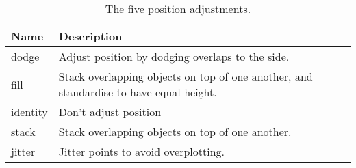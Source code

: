 \begin{table}[ht]
\centering
\begin{tabular}{ll}
  \hline
Name & Description \\ 
  \hline
dodge & Adjust position by dodging overlaps to the side. \\ 
  fill & Stack overlapping objects on top of one another, and standardise to have equal height. \\ 
  identity & Don't adjust position \\ 
  stack & Stack overlapping objects on top of one another. \\ 
  jitter & Jitter points to avoid overplotting. \\ 
   \hline
\end{tabular}
\caption{The five position adjustments.} 
\label{position}
\end{table}
